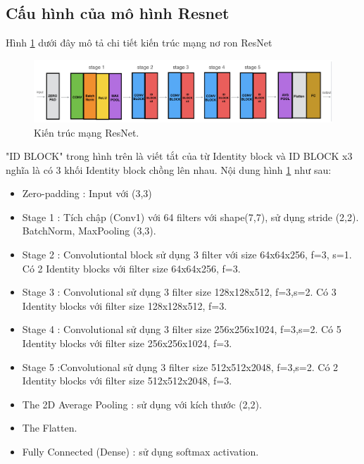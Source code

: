 \subsection{Cấu hình của mô hình Resnet}
Hình \ref{fig:resnet_architecture} dưới đây mô tả chi tiết kiến trúc mạng nơ ron ResNet
\begin{figure}[H]
	\centering
	\includegraphics[width=1\linewidth]{images/resnet_architecture}
	\caption{Kiến trúc mạng ResNet.}
	\label{fig:resnet_architecture}
\end{figure}
"ID BLOCK" trong hình trên là viết tắt của từ Identity block và ID BLOCK x3 nghĩa là có 3 khối Identity block chồng lên nhau. Nội dung hình \ref{fig:resnet_architecture} như sau:
\begin{itemize}
	\item Zero-padding : Input với (3,3)
	\item Stage 1 : Tích chập (Conv1) với 64 filters với shape(7,7), sử dụng stride (2,2). BatchNorm, MaxPooling (3,3).
	\item Stage 2 : Convolutiontal block sử dụng 3 filter với size 64x64x256, f=3, s=1. Có 2 Identity blocks với filter size 64x64x256, f=3.
	\item Stage 3 : Convolutional sử dụng 3 filter size 128x128x512, f=3,s=2. Có 3 Identity blocks với filter size 128x128x512, f=3.
	\item Stage 4 : Convolutional sử dụng 3 filter size 256x256x1024, f=3,s=2. Có 5 Identity blocks với filter size 256x256x1024, f=3.
	\item Stage 5 :Convolutional sử dụng 3 filter size 512x512x2048, f=3,s=2. Có 2 Identity blocks với filter size 512x512x2048, f=3.
	\item The 2D Average Pooling : sử dụng với kích thước (2,2).
	\item The Flatten.
	\item Fully Connected (Dense) : sử dụng softmax activation.
\end{itemize}


